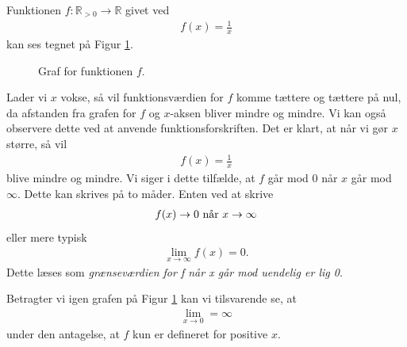 \begin{exa}
	Funktionen $f: \mathbb{R}_{>0} \to \mathbb{R}$ givet ved
	\begin{align*}
		f(x) = \frac{1}{x}
	\end{align*}
	kan ses tegnet på Figur \ref{fig:grænse}.
	\begin{figure}[H]
	\centering
	\caption{Graf for funktionen $f$.}
	\label{fig:grænse}
	\end{figure}
	Lader vi $x$ vokse, så vil funktionsværdien for $f$ komme tættere og tættere på nul, da afstanden fra 
	grafen for $f$ og $x$-aksen bliver mindre og mindre. Vi kan også observere dette ved at anvende 
	funktionsforskriften. Det er klart, at når vi gør $x$ større, så vil 
	\begin{align*}
		f(x) = \frac{1}{x}
	\end{align*}
	blive mindre og mindre. Vi siger i dette tilfælde, at $f$ går mod $0$ når $x$ går mod $\infty$. Dette kan 
	skrives på to måder. Enten ved at skrive
	\begin{align*}
		f(x) \to 0 \textnormal{ når } x \to \infty 
	\end{align*}
	eller mere typisk
	\begin{align*}
		\lim_{x \to \infty} f(x) = 0. 
	\end{align*}
	Dette læses som \textit{grænseværdien for f når x går mod uendelig er lig 0}.
	
	Betragter vi igen grafen på Figur \ref{fig:grænse} kan vi tilsvarende se, at 
	\begin{align*}
		\lim_{x \to 0} = \infty
	\end{align*}
	under den antagelse, at $f$ kun er defineret for positive $x$. 
\end{exa}
